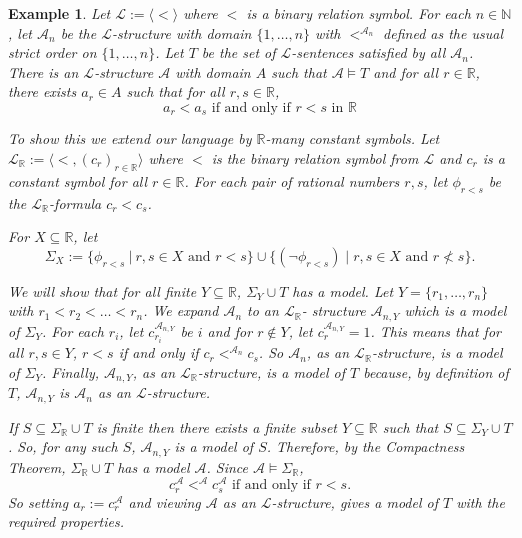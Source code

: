 \documentclass[11pt]{article}
\newtheorem{example}[theorem]{Example}
\newcommand{\mcal}[1]{\mathcal{#1}}
\newcommand{\R}{\mathbb{R}}
\newcommand{\N}{\mathbb{N}}
\newcommand{\st}{\ \vert \ }
\begin{document}
\begin{example}
Let $\mcal{L}:=\langle <\rangle$ where $<$ is a binary relation symbol. For each $n\in\N$, let $\mcal{A}_n$ be the $\mcal{L}$-structure with domain $\{1,\ldots,n\}$ with $<^{\mcal{A}_n}$ defined as the usual strict order on $\{1,\ldots,n\}$. Let $T$ be the set of $\mcal{L}$-sentences satisfied by all $\mcal{A}_n$. There is an $\mcal{L}$-structure $\mcal{A}$  with domain $A$ such that $\mcal{A}\models T$ and for all $r\in \R$, there exists $a_r\in A$ such that for all $r,s\in \R$,
    \[a_r<a_s \text{ if and only if }r<s \text{ in } \R\]

To show this we extend our language by $\R$-many constant symbols.  Let $\mcal{L}_\R:=\langle <, (c_r)_{r\in\R}  \rangle$ where $<$ is the binary relation symbol from $\mcal{L}$ and $c_r$ is a constant symbol for all $r\in \R$. For each pair of rational numbers $r,s$, let $\phi_{r<s}$ be the $\mcal{L}_\R$-formula $c_r<c_s$.

For $X\subseteq \R$, let
\[\Sigma_X:=\{\phi_{r<s} \st r,s\in X \text{ and } r<s\}\cup\{(\neg\phi_{r<s})\mid r,s\in X \text{ and } r \not< s\}.\]

We will show that for all finite $Y\subseteq \R$, $\Sigma_Y\cup T$ has a model. Let $Y=\{r_1,\ldots,r_n\}$ with $r_1<r_2<\ldots<r_n$. We expand $\mcal{A}_n$ to an $\mcal{L}_\R$- structure $\mcal{A}_{n,Y}$ which is a model of $\Sigma_Y$.
For each $r_i$, let $c_{r_i}^{\mcal{A}_{n,Y}}$ be $i$ and for $r\notin Y$, let $c_r^{\mcal{A}_{n,Y}}=1$. This means that for all $r,s\in Y$, $r<s$ if and only if $c_r<^{\mcal{A}_n}c_s$. So $\mcal{A}_n$, as an $\mcal{L}_\R$-structure, is a model of $\Sigma_Y$.
Finally, $\mcal{A}_{n,Y}$, as an $\mcal{L}_\R$-structure, is a model of $T$ because, by definition of $T$, $\mcal{A}_{n,Y}$ is $\mcal{A}_n$ as an $\mcal{L}$-structure.

If $S\subseteq \Sigma_\R\cup T$ is finite then there exists a finite subset $Y\subseteq \R$ such that $S\subseteq \Sigma_Y\cup T$. So, for any such $S$, $\mcal{A}_{n,Y}$ is a model of $S$. Therefore, by the Compactness Theorem, $\Sigma_\R\cup T$ has a model $\mcal{A}$. Since $\mcal{A}\models \Sigma_{\R}$,
\[c_r^{\mcal{A}}<^{\mcal{A}}c_s^{\mcal{A}} \text{ if and only if } r<s.\] So setting $a_r:=c_r^\mcal{A}$ and viewing $\mcal{A}$ as an $\mcal{L}$-structure, gives a model of $T$ with the required properties.
\end{example}


%
%
\end{document}

